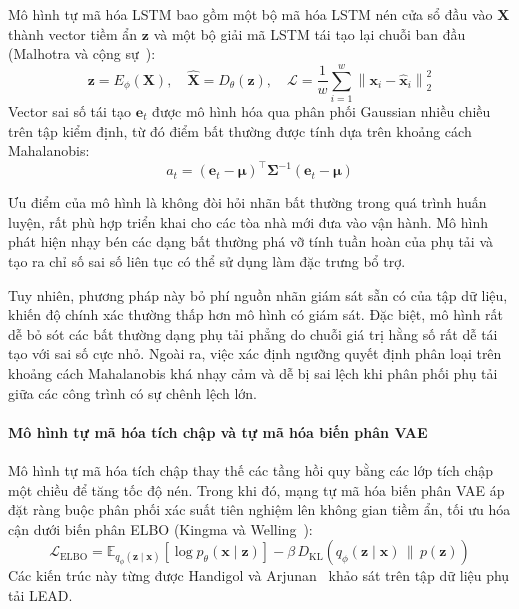 Mô hình tự mã hóa LSTM bao gồm một bộ mã hóa LSTM nén cửa sổ đầu vào $\mathbf{X}$ thành vector tiềm ẩn $\mathbf{z}$ và một bộ giải mã LSTM tái tạo lại chuỗi ban đầu (Malhotra và cộng sự~\cite{lstm_ae}):
\begin{equation*}
    \mathbf{z} = E_{\phi}(\mathbf{X}), \quad \hat{\mathbf{X}} = D_{\theta}(\mathbf{z}), \quad \mathcal{L} = \frac{1}{w} \sum_{i=1}^{w} \left\| \mathbf{x}_i - \hat{\mathbf{x}}_i \right\|_2^2
\end{equation*}
Vector sai số tái tạo $\mathbf{e}_t$ được mô hình hóa qua phân phối Gaussian nhiều chiều trên tập kiểm định, từ đó điểm bất thường được tính dựa trên khoảng cách Mahalanobis:
\begin{equation*}
    a_t = \left(\mathbf{e}_t - \boldsymbol{\mu}\right)^{\top} \boldsymbol{\Sigma}^{-1} \left(\mathbf{e}_t - \boldsymbol{\mu}\right)
\end{equation*}

Ưu điểm của mô hình là không đòi hỏi nhãn bất thường trong quá trình huấn luyện, rất phù hợp triển khai cho các tòa nhà mới đưa vào vận hành. Mô hình phát hiện nhạy bén các dạng bất thường phá vỡ tính tuần hoàn của phụ tải và tạo ra chỉ số sai số liên tục có thể sử dụng làm đặc trưng bổ trợ.

Tuy nhiên, phương pháp này bỏ phí nguồn nhãn giám sát sẵn có của tập dữ liệu, khiến độ chính xác thường thấp hơn mô hình có giám sát. Đặc biệt, mô hình rất dễ bỏ sót các bất thường dạng phụ tải phẳng do chuỗi giá trị hằng số rất dễ tái tạo với sai số cực nhỏ. Ngoài ra, việc xác định ngưỡng quyết định phân loại trên khoảng cách Mahalanobis khá nhạy cảm và dễ bị sai lệch khi phân phối phụ tải giữa các công trình có sự chênh lệch lớn.

\paragraph{Mô hình tự mã hóa tích chập và tự mã hóa biến phân VAE}

Mô hình tự mã hóa tích chập thay thế các tầng hồi quy bằng các lớp tích chập một chiều để tăng tốc độ nén. Trong khi đó, mạng tự mã hóa biến phân VAE áp đặt ràng buộc phân phối xác suất tiên nghiệm lên không gian tiềm ẩn, tối ưu hóa cận dưới biến phân ELBO (Kingma và Welling~\cite{vae}):
\begin{equation*}
    \mathcal{L}_{\text{ELBO}} = \mathbb{E}_{q_{\phi}(\mathbf{z} \mid \mathbf{x})}\left[\log p_{\theta}(\mathbf{x} \mid \mathbf{z})\right] - \beta \, D_{\mathrm{KL}}\left(q_{\phi}(\mathbf{z} \mid \mathbf{x}) \,\|\, p(\mathbf{z})\right)
\end{equation*}
Các kiến trúc này từng được Handigol và Arjunan~\cite{handigol2025} khảo sát trên tập dữ liệu phụ tải LEAD.

